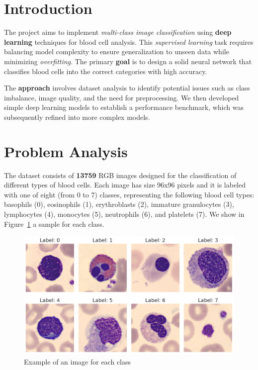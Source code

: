 \documentclass[11pt]{article}
\begin{document}
    \begin{multicols*}{2}        
        \section{Introduction}

        The project aims to implement \textit{multi-class image classification} using \textbf{deep learning} techniques for blood cell analysis. This \textit{supervised learning} task requires balancing model complexity to ensure generalization to unseen data while minimizing \textit{overfitting}. The primary \textbf{goal} is to design a solid neural network that classifies blood cells into the correct categories with high accuracy.
        
        The \textbf{approach} involves dataset analysis to identify potential issues such as class imbalance, image quality, and the need for preprocessing. We then developed simple deep learning models to establish a performance benchmark, which was subsequently refined into more complex models.
        
        \section{Problem Analysis}

        The dataset consists of \textbf{13759} RGB images designed for the classification of different types of blood cells. Each image has size 96x96 pixels and it is labeled with one of eight (from 0 to 7) classes, representing the following blood cell types: basophils (0), eosinophils (1), erythroblasts (2), immature granulocytes (3), lymphocytes (4), monocytes (5), neutrophils (6), and platelets (7). We show in Figure~\ref{fig:dataset} a sample for each class.

        \begin{figure}[H]
            \centering
            \includegraphics[width=\linewidth]{figures/SCR-20241122-nvwz.png}
            \caption{Example of an image for each class}
            \label{fig:dataset}
        \end{figure}


\end{multicols*}
\end{document}
